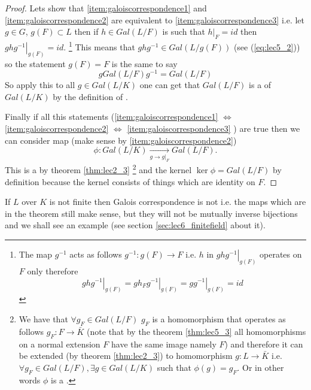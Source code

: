 \begin{theorem}
\begin{proof}
    Lets show that \ref{item:galoiscorrespondence1} and
    \ref{item:galoiscorrespondence2} are equivalent to
    \ref{item:galoiscorrespondence3} i.e. let $g \in G$,
    $g\left(F\right) \subset L$ then if
    $h \in Gal\left(L/F\right)$ is such that $\left.h\right|_F = id$
    then $\left.g h g^{-1}\right|_{g\left(F\right)} = id$.
    \footnote{
      The map $g^{-1}$ acts as follows $g^{-1}: g(F) \to F$ i.e. $h$
      in $\left.g h g^{-1}\right|_{g\left(F\right)}$ operates on $F$
      only therefore
      \[
      \left.g h g^{-1}\right|_{g\left(F\right)} =
      \left.g h_F g^{-1}\right|_{g\left(F\right)}  =
      \left.g g^{-1}\right|_{g\left(F\right)} = id
      \]
    }
    This means
    that $g h g^{-1} \in Gal\left(L/g\left(F\right)\right)$ (see
    (\ref{eq:lec5_2})) so the 
    statement $g\left(F\right) = F$ is the same to say
    \[
    g Gal\left(L/F\right) g^{-1} = Gal\left(L/F\right)
    \]
    So apply this to all $g \in Gal\left(L/K\right)$ one can get that
    $Gal\left(L/F\right)$ is a  of
    $Gal\left(L/K\right)$ by the definition of
    . 

    Finally if all this statements
    (\ref{item:galoiscorrespondence1}
    $\Longleftrightarrow$
    \ref{item:galoiscorrespondence2}
    $\Longleftrightarrow$
    \ref{item:galoiscorrespondence3}
    ) are true then we can consider map (make sense by
    \ref{item:galoiscorrespondence2}) 
    \[
    \phi: Gal\left(L/K\right)
    \xrightarrow[g \to \left.g\right|_F]{}
    Gal\left(L/F\right).
    \]
    This is a  by theorem \ref{thm:lec2_3}
    \footnote{
      We have that $\forall g_F \in Gal\left(L/F\right)$ $g_F$ is a
      homomorphism that operates as follows $g_F: F \to \bar{K}$
      (note that by the theorem \ref{thm:lec5_3} all homomorphisms on
      a normal extension $F$ have the same image namely $F$)
      and
      therefore it can be extended (by theorem 
      \ref{thm:lec2_3}) to homomorphism $g: L \to \bar{K}$
      i.e. $\forall g_F \in  Gal\left(L/F\right), \exists g \in
      Gal\left(L/K\right)$ such that $\phi(g) = g_F$. Or in other
      words $\phi$ is a .
    }
    and the kernel $\ker \phi = Gal\left(L/F\right)$ by
    definition because the kernel consists of things which are identity on $F$. 
  \end{proof}
\end{theorem}

\begin{remark}
  If $L$ over $K$ is not finite then Galois correspondence is not
   i.e. the maps which are in the theorem still
  make sense, but they will not be mutually inverse bijections and we
  shall see an example (see section \ref{sec:lec6_finitefield} about it).
  \label{rem:lec6_gcnotbijection}
\end{remark}

